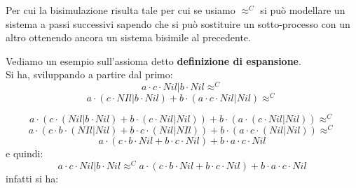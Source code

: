 Per cui la bisimulazione risulta tale per cui se usiamo $\approx^C$ si può
modellare un sistema a passi successivi sapendo che si può sostituire un
sotto-processo con un altro ottenendo ancora un sistema bisimile al precedente.
\begin{esempio}
  Vediamo un esempio sull'assioma detto \textbf{definizione di espansione}.\\
  Si ha, sviluppando a partire dal primo:
  \[a\cdot c\cdot Nil|b\cdot Nil\approx^C\]
  \[a\cdot(c\cdot NIl|b\cdot Nil)+b\cdot(a\cdot c \cdot Nil|Nil)\approx^C\]

  \[a\cdot(c\cdot(Nil|b\cdot Nil)+b\cdot(c\cdot Nil|Nil))+b\cdot(a\cdot(c\cdot
    Nil|Nil))\approx^C\]
  \[a\cdot (c\cdot b\cdot(NIl|Nil)+b\cdot c\cdot(Nil|NIl))+b\cdot(a\cdot
    c\cdot(Nil|Nil))\approx^C\]
  \[a\cdot(c\cdot b\cdot Nil+b\cdot c\cdot Nil)+b\cdot a\cdot c\cdot Nil\]
  e quindi:
  \[a\cdot c\cdot Nil|b\cdot Nil\approx^Ca\cdot(c\cdot b\cdot Nil+b\cdot c\cdot
    Nil)+b\cdot a\cdot c\cdot Nil\]
  infatti si ha:
   \begin{center}
  \end{center}
\end{esempio}
